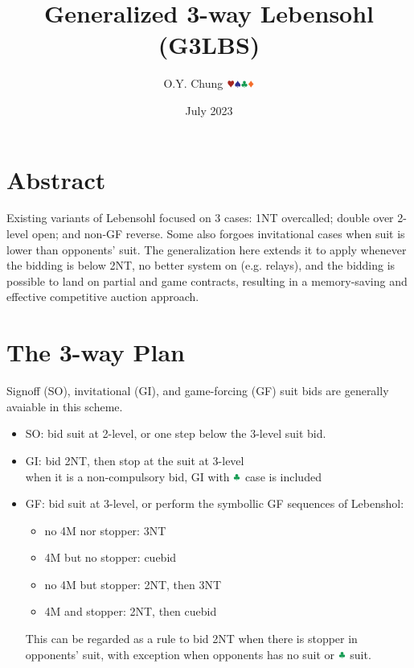 \documentclass{article}
\title{Generalized 3-way Lebensohl (G3LBS)}
\author{O.Y. Chung $\hhh\sss\ccc\ddd$}
\date{July 2023}
\begin{document}
\begin{CJK*}{UTF8}{gbsn}
\end{CJK*}
\maketitle

\begin{multicols}{2}

\section{Abstract}
Existing variants of Lebensohl focused on 3 cases: 1NT overcalled; double over 2-level open; and non-GF reverse. Some also forgoes invitational cases when suit is lower than opponents' suit. The generalization here extends it to apply whenever the bidding is below 2NT, no better system on (e.g. relays), and the bidding is possible to land on partial and game contracts, resulting in a memory-saving and effective competitive auction approach.

\section{The 3-way Plan}
Signoff (SO), invitational (GI), and game-forcing (GF) suit bids are generally avaiable in this scheme.

\begin{itemize}
    \item SO: bid suit at 2-level, or one step below the 3-level suit bid.
    \item GI: bid 2NT, then stop at the suit at 3-level \\
    when it is a non-compulsory bid, GI with $\ccc$ case is included
    \item GF: bid suit at 3-level, or perform the symbollic GF sequences of Lebenshol:
    \begin{itemize}
        \item no 4M nor stopper: 3NT
        \item 4M but no stopper: cuebid
        \item no 4M but stopper: 2NT, then 3NT
        \item 4M and stopper: 2NT, then cuebid
    \end{itemize}
    This can be regarded as a rule to bid 2NT when there is stopper in opponents' suit, with exception when opponents has no suit or $\ccc$ suit.
\end{itemize}


\end{multicols}
\end{document}
